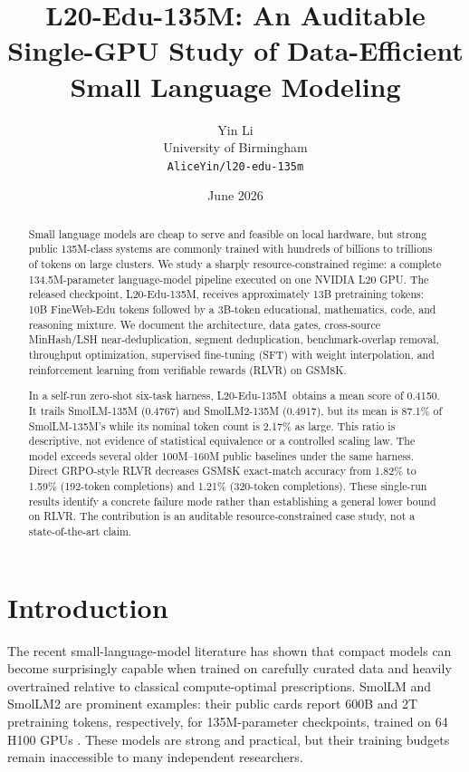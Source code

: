 \documentclass[11pt]{article}
\title{\textbf{L20-Edu-135M: An Auditable Single-GPU Study of Data-Efficient Small Language Modeling}}
\author{
  Yin Li\\
  University of Birmingham\\
  \texttt{AliceYin/l20-edu-135m}
}
\date{June 2026}
\newcommand{\model}{L20-Edu-135M}
\begin{document}
\maketitle

\begin{abstract}
Small language models are cheap to serve and feasible on local hardware, but strong public 135M-class systems are commonly trained with hundreds of billions to trillions of tokens on large clusters. We study a sharply resource-constrained regime: a complete 134.5M-parameter language-model pipeline executed on one NVIDIA L20 GPU. The released checkpoint, \model, receives approximately 13B pretraining tokens: 10B FineWeb-Edu tokens followed by a 3B-token educational, mathematics, code, and reasoning mixture. We document the architecture, data gates, cross-source MinHash/LSH near-deduplication, segment deduplication, benchmark-overlap removal, throughput optimization, supervised fine-tuning (SFT) with weight interpolation, and reinforcement learning from verifiable rewards (RLVR) on GSM8K.

In a self-run zero-shot six-task harness, \model\ obtains a mean score of 0.4150. It trails SmolLM-135M (0.4767) and SmolLM2-135M (0.4917), but its mean is 87.1\% of SmolLM-135M's while its nominal token count is 2.17\% as large. This ratio is descriptive, not evidence of statistical equivalence or a controlled scaling law. The model exceeds several older 100M--160M public baselines under the same harness. Direct GRPO-style RLVR decreases GSM8K exact-match accuracy from 1.82\% to 1.59\% (192-token completions) and 1.21\% (320-token completions). These single-run results identify a concrete failure mode rather than establishing a general lower bound on RLVR. The contribution is an auditable resource-constrained case study, not a state-of-the-art claim.
\end{abstract}

\section{Introduction}

The recent small-language-model literature has shown that compact models can become surprisingly capable when trained on carefully curated data and heavily overtrained relative to classical compute-optimal prescriptions. SmolLM and SmolLM2 are prominent examples: their public cards report 600B and 2T pretraining tokens, respectively, for 135M-parameter checkpoints, trained on 64 H100 GPUs \citep{smollm_blog,smollm135_card,smollm2_card,allal2025smollm2}. These models are strong and practical, but their training budgets remain inaccessible to many independent researchers.
\end{document}
